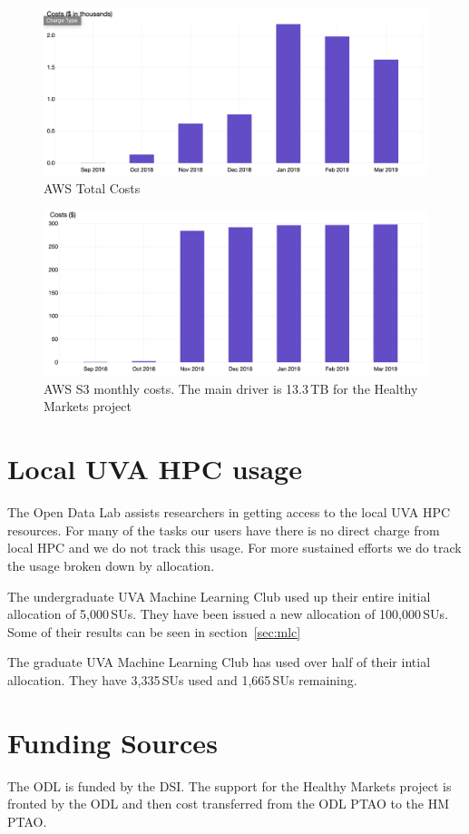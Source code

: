 \begin{figure}[!hbtp]
\includegraphics[width=\textwidth]{images/aws-metrics/throughmar/total.png}
\caption{AWS Total Costs\label{fg:awstotal}}
\end{figure}
\begin{figure}[!hbtp]
\includegraphics[width=\textwidth]{images/aws-metrics/throughmar/s3.png}
\caption{AWS S3 monthly costs. The main driver is 13.3\,TB for the Healthy Markets project\label{fg:awss3}}
\end{figure}


\section{Local UVA HPC usage}
The Open Data Lab assists researchers in getting access to the local UVA HPC resources. For many of the tasks our users have there is no direct charge from local HPC and we do not track this usage. For more sustained efforts we do track the usage broken down by allocation.

The undergraduate UVA Machine Learning Club used up their entire initial allocation of 5,000\,SUs. They have been issued a new allocation of 100,000\,SUs. Some of their results can be seen in section~\ref{sec:mlc}

The graduate UVA Machine Learning Club has used over half of their intial allocation. They have 3,335\,SUs used and 1,665\,SUs remaining.

\section{Funding Sources}
The ODL is funded by the DSI. The support for the Healthy Markets project is fronted by the ODL and then  cost transferred from the ODL PTAO to the HM PTAO.

